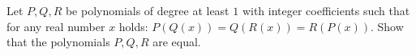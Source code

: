 Let $P,Q,R$  be polynomials of degree at least $1$ with integer coefficients such that for any real number $x$ holds:  $P(Q(x))=Q(R(x))=R(P(x))$. Show that the polynomials $P,Q,R$ are equal.